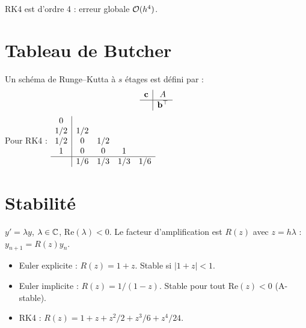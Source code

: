 \begin{theoreme}[Ordre de RK4]
RK4 est d'ordre 4 : erreur globale $\mathcal{O}(h^4)$.
\end{theoreme}

\section{Tableau de Butcher}

\begin{definition}
Un sch\'ema de Runge--Kutta \`a $s$ \'etages est d\'efini par :
\[
\begin{array}{c|c}
\mathbf{c} & A \\
\hline
& \mathbf{b}^\top
\end{array}
\]
Pour RK4 :
$\begin{array}{c|cccc}
0 & & & & \\
1/2 & 1/2 & & & \\
1/2 & 0 & 1/2 & & \\
1 & 0 & 0 & 1 & \\
\hline
& 1/6 & 1/3 & 1/3 & 1/6
\end{array}$
\end{definition}

\section{Stabilit\'e}

\begin{definition}
$y'=\lambda y$, $\lambda\in\mathbb{C}$, $\text{Re}(\lambda)<0$. Le facteur d'amplification est $R(z)$ avec $z=h\lambda$ : $y_{n+1}=R(z)y_n$.
\begin{itemize}
\item Euler explicite : $R(z)=1+z$. Stable si $|1+z|<1$.
\item Euler implicite : $R(z)=1/(1-z)$. Stable pour tout $\text{Re}(z)<0$ (A-stable).
\item RK4 : $R(z)=1+z+z^2/2+z^3/6+z^4/24$.
\end{itemize}
\end{definition}

\begin{center}
\end{center}

